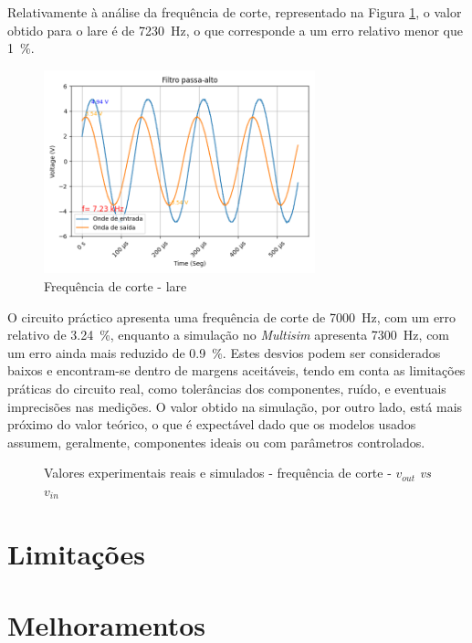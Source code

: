 Relativamente à análise da frequência de corte, representado na Figura \ref{fig:fcvoutlare}, o valor obtido para o \acrshort{lare} é de \SI{7230}{\hertz}, o que corresponde a um erro relativo menor que \SI{1}{\percent}.

\begin{figure}[hbtp]
	\centering
	\includegraphics[width=0.7\textwidth]{figures/filtro_passa-alto_fc_LaRE.png}
	\caption{Frequência de corte - \acrshort{lare}}
	\label{fig:fcvoutlare}
\end{figure}

O circuito práctico apresenta uma frequência de corte de \SI{7000}{\hertz}, com um erro relativo de \SI{3.24}{\percent}, enquanto a simulação no \textit{Multisim} apresenta \SI{7300}{\hertz}, com um erro ainda mais reduzido de \SI{0.9}{\percent}. Estes desvios podem ser considerados baixos e encontram-se dentro de margens aceitáveis, tendo em conta as limitações práticas do circuito real, como tolerâncias dos componentes, ruído, e eventuais imprecisões nas medições. O valor obtido na simulação, por outro lado, está mais próximo do valor teórico, o que é expectável dado que os modelos usados assumem, geralmente, componentes ideais ou com parâmetros controlados.

\begin{figure}[hbtp]
	\centering%
		\centering
		\qquad
		\caption{Valores experimentais reais e simulados - frequência de corte - $v_{out}$ \textit{vs} $v_{in}$}%
		\label{fig:simulacaovout}%
	\end{figure}


\section{Limitações}
\section{Melhoramentos}


